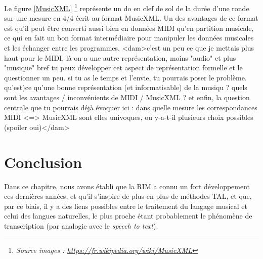 Le figure \ref{MusicXML}
\footnote{\textit{Source images :
\url{https://fr.wikipedia.org/wiki/MusicXML}}}
représente un do en clef de sol de la durée d’une ronde sur une mesure en 4/4
écrit au format MusicXML.
Un des avantages de ce format est qu’il peut être converti aussi bien en
données MIDI qu’en partition musicale, ce qui en fait un bon format
intermédiaire pour manipuler les données musicales et les échanger entre les
programmes.
<dam>c'est un peu ce que je mettais plus haut pour le MIDI, là on a une autre
représentation, moins "audio" et plus "musique" bref tu peux développer cet
aspect de représentation formelle et le questionner un peu.
si tu as le temps et l'envie, tu pourrais poser le problème. qu'est)ce qu'une
bonne représentation (et informatisable) de la musiqu ? quels sont les
avantages / inconvénients de MIDI / MusicXML ?
et enfin, la question centrale que tu pourrais déjà évoquer ici : dans quelle
mesure les correspondances MIDI <=> MusicXML sont elles univoques, ou y-a-t-il
plusieurs choix possibles (spoiler oui)</dam>

\section*{Conclusion}
Dans ce chapitre, nous avons établi que la RIM a connu un fort développement
ces dernières années, et qu'il s'inspire de plus en plus de méthodes TAL, et
que, par ce biais, il y a des liens possibles entre le traitement du langage
musical et celui des langues naturelles, le plus proche étant probablement le
phénomène de transcription (par analogie avec le \textit{speech to text}).
